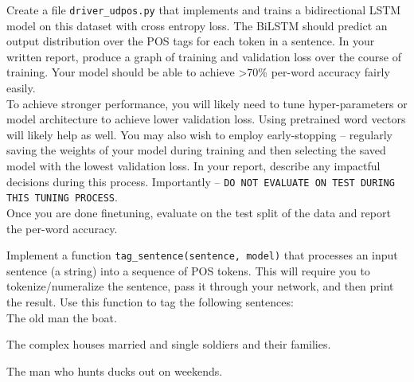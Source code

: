 \documentclass[a4paper,10pt]{article}
\begin{document}
\vspace{5pt}
\begin{taskbox}
 Create a file \texttt{driver\_udpos.py} that implements and trains a bidirectional LSTM model on this dataset with cross entropy loss. The BiLSTM should predict an output distribution over the POS tags for each token in a sentence. In your written report, produce a graph of training and validation loss over the course of training. Your model should be able to achieve >70\% per-word accuracy fairly easily. \\[5pt] 

To achieve stronger performance, you will likely need to tune hyper-parameters or model architecture to achieve lower validation loss. Using pretrained word vectors will likely help as well. You may also wish to employ early-stopping -- regularly saving the weights of your model during training and then selecting the saved model with the lowest validation loss. In your report, describe any impactful decisions during this process. Importantly -- \texttt{DO NOT EVALUATE ON TEST DURING THIS TUNING PROCESS}.\\[5pt]

Once you are done finetuning, evaluate on the test split of the data and report the per-word accuracy. 
\end{taskbox}
\vspace{5pt}

\vspace{5pt}
\begin{taskbox}
 Implement a function \texttt{tag\_sentence(sentence, model)} that processes an input sentence (a string) into a sequence of POS tokens. This will require you to tokenize/numeralize the sentence, pass it through your network, and then print the result. Use this function to tag the following sentences:\\[5pt]

The old man the boat.

The complex houses married and single soldiers and their families.

The man who hunts ducks out on weekends.


\end{taskbox}
\vspace{5pt}

\vspace{20pt}
\renewcommand{\section}[2]{ {\hspace{-20pt}\color{blue!60}{\Large #2}} }

%
%
    
\end{document}
